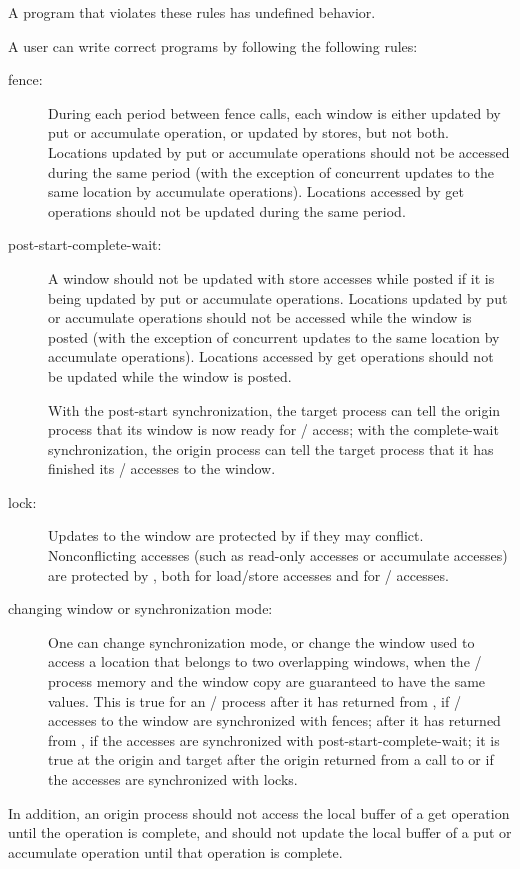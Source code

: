 
A program that violates these rules has undefined behavior.

\begin{users}
A user can write correct programs by following the following rules:
\begin{description}
\item[fence:] During each period between fence calls, each window is
either updated by put or accumulate operation, or updated by
stores,
but not both.  Locations updated by put or accumulate operations
should not be
accessed during the same period (with the exception of
concurrent updates to the same location by accumulate operations).
Locations accessed by
get operations should not be updated during the same period.
\item[post-start-complete-wait:] A window should not be updated
with store accesses while posted if it is being updated by put or
accumulate operations.  Locations updated by put or accumulate
operations should not be accessed while the window is posted (with the
exception of concurrent updates to the same location by
accumulate operations).
Locations accessed by get operations should not be updated while
the window is posted.

With the post-start synchronization, the target process can tell
the origin process that its window is now ready for \RMA/ access; with
the complete-wait synchronization, the origin process can tell the
target process that it has finished its \RMA/ accesses to the 
window.
\item[lock:] Updates to the window are protected by  if
they may conflict.  Nonconflicting accesses (such as read-only accesses
or accumulate accesses) are protected by ,
both for load/store accesses and for \RMA/ accesses.
\item[changing window or synchronization mode:]\quad
One can change synchronization mode, or change the window used to
access a location that belongs to two overlapping windows, when the
\mpi/ process memory and the window copy are guaranteed to have the same
values.  This is true for an \mpi/ process after it has returned from
, if
\RMA/ accesses to the window are synchronized with fences; after it has
returned from , if the accesses are synchronized
with post-start-complete-wait;
it is true at the origin and target after the origin returned from a call to
 or  
if the accesses are synchronized with locks.
\end{description}
In addition, an origin process should not access the local buffer of a
get operation until the operation is complete, and should not update
the local buffer of a put or accumulate operation until that operation
is complete.


\end{users}
